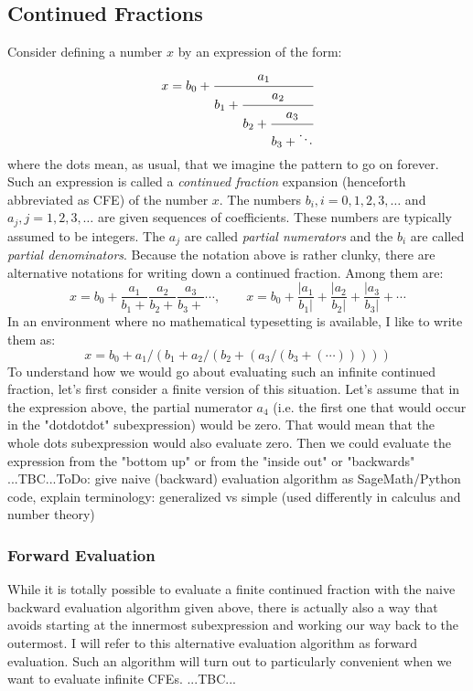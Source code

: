 \subsection{Continued Fractions}
Consider defining a number $x$ by an expression of the form:
\begin{equation}
x = b_0 + \cfrac{a_1}{b_1 + \cfrac{a_2}{b_2 + \cfrac{a_3}{b_3 + \ddots }}}
\end{equation}
where the dots mean, as usual, that we imagine the pattern to go on forever. Such an expression is called a \emph{continued fraction} expansion (henceforth abbreviated as CFE) of the number $x$. The numbers $b_i, i = 0,1,2,3,\ldots$ and $a_j, j = 1,2,3,\ldots$ are given sequences of coefficients. These numbers are typically assumed to be integers. The $a_j$ are called \emph{partial numerators} and the $b_i$ are called \emph{partial denominators}. Because the notation above is rather clunky, there are alternative notations for writing down a continued fraction. Among them are:
\begin{equation}
x = b_0 + \frac{a_1}{b_1 +} \frac{a_2}{b_2 +} \frac{a_3}{b_3 +} \cdots, \qquad
x = b_0 + \frac{|a_1}{b_1|} + \frac{|a_2}{b_2|} + \frac{|a_3}{b_3|} + \cdots
\end{equation}
In an environment where no mathematical typesetting is available, I like to write them as:
\begin{equation}
x = b_0 + a_1 / (b_1 + a_2 / (b_2 + (a_3 /  (b_3 + (\cdots))))) 
\end{equation}
To understand how we would go about evaluating such an infinite continued fraction, let's first consider a finite version of this situation. Let's assume that in the expression above, the partial numerator $a_4$ (i.e. the first one that would occur in the "dotdotdot" subexpression) would be zero. That would mean that the whole dots subexpression would also evaluate zero. Then we could evaluate the expression from the "bottom up" or from the "inside out" or "backwards"   ...TBC...ToDo: give naive (backward) evaluation algorithm as SageMath/Python code, explain terminology: generalized vs simple (used differently in calculus and number theory)


\subsubsection{Forward Evaluation}
While it is totally possible to evaluate a finite continued fraction with the naive backward evaluation algorithm given above, there is actually also a way that avoids starting at the innermost subexpression and working our way back to the outermost. I will refer to this alternative evaluation algorithm as forward evaluation. Such an algorithm will turn out to particularly convenient when we want to evaluate infinite CFEs. ...TBC...

